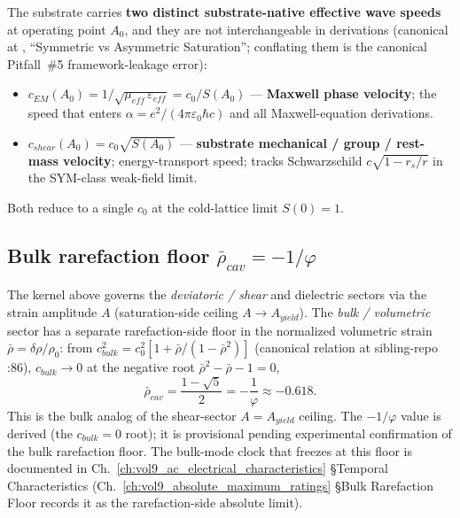 The substrate carries \textbf{two distinct substrate-native effective wave speeds} at operating point $A_0$, and they are not interchangeable in derivations (canonical at , ``Symmetric vs Asymmetric Saturation''; conflating them is the canonical Pitfall~\#5 framework-leakage error):

\begin{itemize}
    \item $c_{EM}(A_0) = 1/\sqrt{\mu_{eff}\,\varepsilon_{eff}} = c_0/S(A_0)$ --- \textbf{Maxwell phase velocity}; the speed that enters $\alpha = e^2/(4\pi\varepsilon_0 \hbar c)$ and all Maxwell-equation derivations.
    \item $c_{shear}(A_0) = c_0 \sqrt{S(A_0)}$ --- \textbf{substrate mechanical / group / rest-mass velocity}; energy-transport speed; tracks Schwarzschild $c\sqrt{1 - r_s/r}$ in the SYM-class weak-field limit.
\end{itemize}

Both reduce to a single $c_0$ at the cold-lattice limit $S(0) = 1$.

\subsection{Bulk rarefaction floor $\bar{\rho}_{cav} = -1/\varphi$}
\label{sec:vol9_rho_cav_saturation}

The kernel above governs the \emph{deviatoric / shear} and dielectric sectors via the strain amplitude $A$ (saturation-side ceiling $A \to A_{yield}$). The \emph{bulk / volumetric} sector has a separate rarefaction-side floor in the normalized volumetric strain $\bar{\rho} = \delta\rho/\rho_0$: from $c_{bulk}^2 = c_0^2[1 + \bar{\rho}/(1-\bar{\rho}^2)]$ (canonical relation at sibling-repo :86), $c_{bulk} \to 0$ at the negative root $\bar{\rho}^2 - \bar{\rho} - 1 = 0$,
\begin{equation}
\bar{\rho}_{cav} = \frac{1-\sqrt{5}}{2} = -\frac{1}{\varphi} \approx -0.618 .
\end{equation}
This is the bulk analog of the shear-sector $A = A_{yield}$ ceiling. The $-1/\varphi$ value is derived (the $c_{bulk}=0$ root); it is provisional pending experimental confirmation of the bulk rarefaction floor. The bulk-mode clock that freezes at this floor is documented in Ch.~\ref{ch:vol9_ac_electrical_characteristics} \S Temporal Characteristics (Ch.~\ref{ch:vol9_absolute_maximum_ratings} \S Bulk Rarefaction Floor records it as the rarefaction-side absolute limit).

